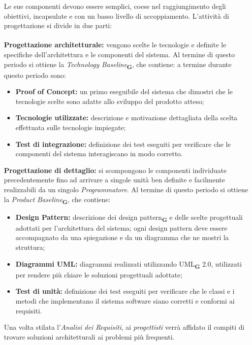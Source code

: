 Le sue componenti devono essere semplici, coese nel raggiungimento degli obiettivi, incapsulate e con un basso livello di accoppiamento.
\label{Periodi della progettazione}
L'attività di progettazione si divide in due parti:\\\\
\textbf{Progettazione architetturale:} vengono scelte le tecnologie e definite le specifiche dell'architettura e le componenti del sistema. Al termine di questo periodo
si ottiene la \textit{Technology Baseline}\textsubscript{\textbf{G}}, che contiene:
a termine durante questo periodo sono:
\begin{itemize}
    \item \textbf{Proof of Concept:} un primo eseguibile del sistema che dimostri che le tecnologie scelte sono adatte allo sviluppo del prodotto atteso;
    \item \textbf{Tecnologie utilizzate:} descrizione e motivazione dettagliata della scelta effettuata sulle tecnologie impiegate;
    \item \textbf{Test di integrazione:} definizione dei test eseguiti per verificare che le componenti del sistema interagiscano in modo corretto.
\end{itemize}
\textbf{Progettazione di dettaglio:} si scompongono le componenti individuate precedentemente fino ad
arrivare a singole unità ben definite e facilmente realizzabili da un singolo \textit{Programmatore}. Al termine di questo periodo si
ottiene la \textit{Product Baseline}\textsubscript{\textbf{G}}, che contiene:
\begin{itemize}
    \item \textbf{Design Pattern:} descrizione dei design pattern\textsubscript{\textbf{G}} e delle scelte progettuali adottati per l'architettura del sistema; ogni design pattern deve essere accompagnato da una spiegazione e
          da un diagramma che ne mostri la struttura;
    \item \textbf{Diagrammi UML:} diagrammi realizzati utilizzando UML\textsubscript{\textbf{G}} 2.0, utilizzati per rendere più chiare le soluzioni progettuali adottate;
    \item \textbf{Test di unità:} definizione dei test eseguiti per verificare che le classi e i metodi che implementano il sistema software siano corretti e conformi ai requisiti.
\end{itemize}
Una volta stilata l'\textit{Analisi dei Requisiti}, ai \textit{progettisti} verrà affidato il compiti di trovare soluzioni architetturali ai problemi più frequenti.
